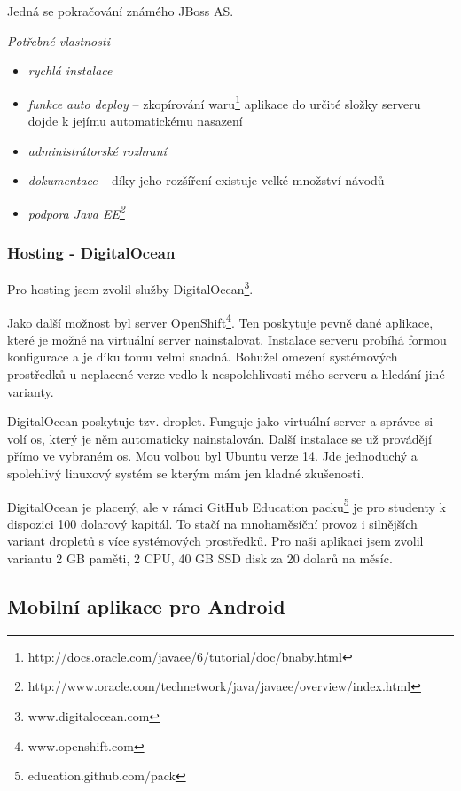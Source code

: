 \documentclass[thesis=B,czech]{FITthesis}[2012/06/26]
\begin{document}
Jedná se pokračování známého JBoss AS\cite{wildfly}.\newline

\textit{Potřebné vlastnosti} 
\begin{itemize}[nosep]
	\item \textit{rychlá instalace}
	\item \textit{funkce auto deploy} -- zkopírování waru\footnote{http://docs.oracle.com/javaee/6/tutorial/doc/bnaby.html} aplikace do určité složky serveru dojde k jejímu automatickému nasazení
	\item \textit{administrátorské rozhraní}
	\item \textit{dokumentace} -- díky jeho rozšíření existuje velké množství návodů  
	\item \textit{podpora Java EE\footnote{http://www.oracle.com/technetwork/java/javaee/overview/index.html}}
\end{itemize}

\subsubsection{Hosting - DigitalOcean}

Pro hosting jsem zvolil služby DigitalOcean\footnote{www.digitalocean.com}.

Jako další možnost byl server OpenShift\footnote{www.openshift.com}. Ten poskytuje pevně dané aplikace, které je možné na virtuální server nainstalovat. Instalace serveru probíhá formou konfigurace a je díku tomu velmi snadná. Bohužel omezení systémových prostředků u neplacené verze vedlo k nespolehlivosti mého serveru a hledání jiné varianty. 

DigitalOcean poskytuje tzv. droplet. Funguje jako virtuální server a správce si volí \acrshort{os}, který je něm automaticky nainstalován. Další instalace se už provádějí přímo ve vybraném \acrshort{os}. Mou volbou byl Ubuntu verze 14. Jde jednoduchý a spolehlivý linuxový systém se kterým mám jen kladné zkušenosti. 

DigitalOcean je placený, ale v rámci GitHub Education packu\footnote{education.github.com/pack} je pro studenty k dispozici 100 dolarový kapitál. To stačí na mnohaměsíční provoz i silnějších variant dropletů s více systémových prostředků. Pro naši aplikaci jsem zvolil variantu 2 GB paměti, 2 CPU, 40 GB SSD disk za 20 dolarů na měsíc.  

\subsection{Mobilní aplikace pro Android}
\end{document}
